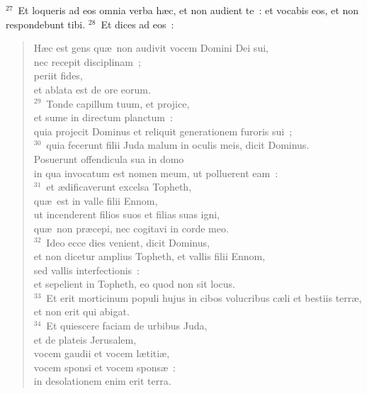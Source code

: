 ${}^{27}$~Et loqueris ad eos omnia verba h\ae c, et non audient te~: et vocabis eos, et non respondebunt tibi.
${}^{28}$~Et dices ad eos~: \begin{verse}H\ae c est gens qu\ae\ non audivit vocem Domini Dei sui,\\ nec recepit disciplinam~;\\ periit fides,\\ et ablata est de ore eorum.\\
${}^{29}$~Tonde capillum tuum, et projice,\\ et sume in directum planctum~:\\ quia projecit Dominus et reliquit generationem furoris sui~;\\
${}^{30}$~quia fecerunt filii Juda malum in oculis meis, dicit Dominus.\\ Posuerunt offendicula sua in domo\\ in qua invocatum est nomen meum, ut polluerent eam~:\\
${}^{31}$~et \ae dificaverunt excelsa Topheth,\\ qu\ae\ est in valle filii Ennom,\\ ut incenderent filios suos et filias suas igni,\\ qu\ae\ non pr\ae cepi, nec cogitavi in corde meo.\\
${}^{32}$~Ideo ecce dies venient, dicit Dominus,\\ et non dicetur amplius Topheth, et vallis filii Ennom,\\ sed vallis interfectionis~:\\ et sepelient in Topheth, eo quod non sit locus.\\
${}^{33}$~Et erit morticinum populi hujus in cibos volucribus c\ae li et bestiis terr\ae ,\\ et non erit qui abigat.\\
${}^{34}$~Et quiescere faciam de urbibus Juda,\\ et de plateis Jerusalem,\\ vocem gaudii et vocem l\ae titi\ae ,\\ vocem sponsi et vocem spons\ae~:\\ in desolationem enim erit terra.\end{verse}



